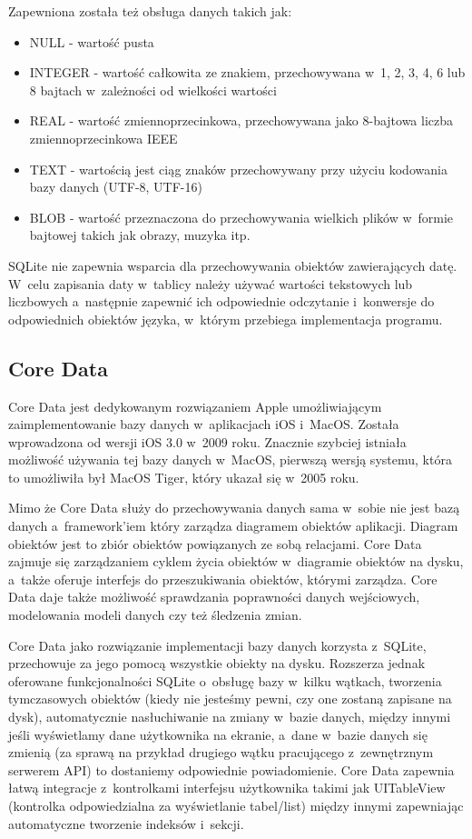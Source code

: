 Zapewniona została też obsługa danych takich jak: 

\begin{itemize}
	\item NULL - wartość pusta
	\item INTEGER - wartość całkowita ze znakiem, przechowywana w~1, 2, 3, 4, 6 lub 8 bajtach w~zależności od wielkości wartości
	\item REAL - wartość zmiennoprzecinkowa, przechowywana jako 8-bajtowa liczba zmiennoprzecinkowa IEEE
	\item TEXT - wartością jest ciąg znaków przechowywany przy użyciu kodowania bazy danych (UTF-8, UTF-16)
	\item BLOB - wartość przeznaczona do przechowywania wielkich plików w~formie bajtowej takich jak obrazy, muzyka itp. 
\end{itemize}

SQLite nie zapewnia wsparcia dla przechowywania obiektów zawierających datę. W~celu zapisania daty w~tablicy należy używać wartości tekstowych lub liczbowych a~następnie zapewnić ich odpowiednie odczytanie i~konwersje do odpowiednich obiektów języka, w~którym przebiega implementacja programu. 

\subsection{Core Data}

Core Data jest dedykowanym rozwiązaniem Apple umożliwiającym zaimplementowanie bazy danych w~aplikacjach iOS i~MacOS. Została wprowadzona od wersji iOS 3.0 w~2009 roku. Znacznie szybciej istniała możliwość używania tej bazy danych w~MacOS,  pierwszą wersją systemu, która to umożliwiła był MacOS Tiger, który ukazał się w~2005 roku\cite{CoreData-doc}.\par

Mimo że Core Data służy do przechowywania danych sama w~sobie nie jest bazą danych a~framework'iem który zarządza diagramem obiektów aplikacji. Diagram obiektów jest to zbiór obiektów powiązanych ze sobą relacjami. Core Data zajmuje się zarządzaniem cyklem życia obiektów w~diagramie obiektów na dysku, a~także oferuje interfejs do przeszukiwania obiektów, którymi zarządza. Core Data daje także możliwość sprawdzania poprawności danych wejściowych, modelowania modeli danych czy też śledzenia zmian. \par

Core Data jako rozwiązanie implementacji bazy danych korzysta z~SQLite, przechowuje za jego pomocą wszystkie obiekty na dysku. Rozszerza jednak oferowane funkcjonalności SQLite o~obsługę bazy w~kilku wątkach, tworzenia tymczasowych obiektów (kiedy nie jesteśmy pewni, czy one zostaną zapisane na dysk), automatycznie nasłuchiwanie na zmiany w~bazie danych, między innymi jeśli wyświetlamy dane użytkownika na ekranie, a~dane w~bazie danych się zmienią (za sprawą na przykład drugiego wątku pracującego z~zewnętrznym serwerem API) to dostaniemy odpowiednie powiadomienie. Core Data zapewnia łatwą integracje z~kontrolkami interfejsu użytkownika takimi jak UITableView (kontrolka odpowiedzialna za wyświetlanie tabel/list) między innymi zapewniając automatyczne tworzenie indeksów i~sekcji.\par

